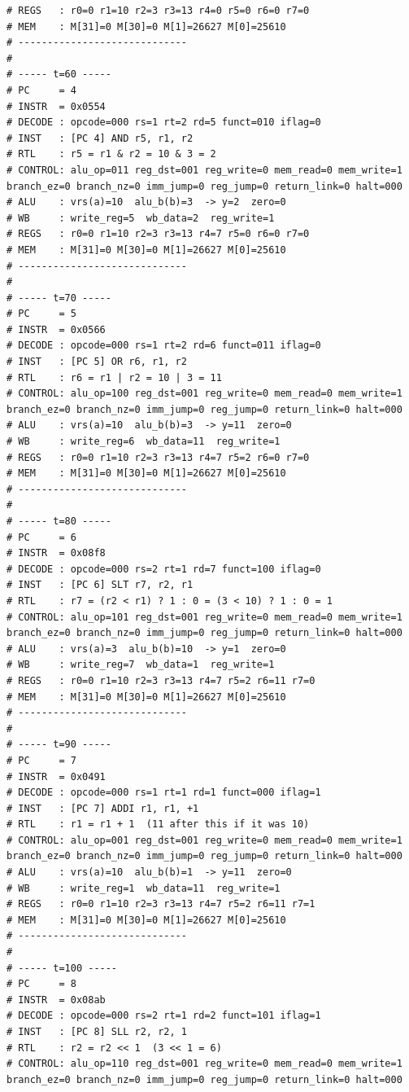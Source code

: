 \documentclass[12pt]{report}
\begin{document}
\begin{lstlisting}
# REGS   : r0=0 r1=10 r2=3 r3=13 r4=0 r5=0 r6=0 r7=0
# MEM    : M[31]=0 M[30]=0 M[1]=26627 M[0]=25610
# -----------------------------
# 
# ----- t=60 -----
# PC     = 4
# INSTR  = 0x0554
# DECODE : opcode=000 rs=1 rt=2 rd=5 funct=010 iflag=0
# INST   : [PC 4] AND r5, r1, r2
# RTL    : r5 = r1 & r2 = 10 & 3 = 2
# CONTROL: alu_op=011 reg_dst=001 reg_write=0 mem_read=0 mem_write=1 branch_ez=0 branch_nz=0 imm_jump=0 reg_jump=0 return_link=0 halt=000
# ALU    : vrs(a)=10  alu_b(b)=3  -> y=2  zero=0
# WB     : write_reg=5  wb_data=2  reg_write=1
# REGS   : r0=0 r1=10 r2=3 r3=13 r4=7 r5=0 r6=0 r7=0
# MEM    : M[31]=0 M[30]=0 M[1]=26627 M[0]=25610
# -----------------------------
# 
# ----- t=70 -----
# PC     = 5
# INSTR  = 0x0566
# DECODE : opcode=000 rs=1 rt=2 rd=6 funct=011 iflag=0
# INST   : [PC 5] OR r6, r1, r2
# RTL    : r6 = r1 | r2 = 10 | 3 = 11
# CONTROL: alu_op=100 reg_dst=001 reg_write=0 mem_read=0 mem_write=1 branch_ez=0 branch_nz=0 imm_jump=0 reg_jump=0 return_link=0 halt=000
# ALU    : vrs(a)=10  alu_b(b)=3  -> y=11  zero=0
# WB     : write_reg=6  wb_data=11  reg_write=1
# REGS   : r0=0 r1=10 r2=3 r3=13 r4=7 r5=2 r6=0 r7=0
# MEM    : M[31]=0 M[30]=0 M[1]=26627 M[0]=25610
# -----------------------------
# 
# ----- t=80 -----
# PC     = 6
# INSTR  = 0x08f8
# DECODE : opcode=000 rs=2 rt=1 rd=7 funct=100 iflag=0
# INST   : [PC 6] SLT r7, r2, r1
# RTL    : r7 = (r2 < r1) ? 1 : 0 = (3 < 10) ? 1 : 0 = 1
# CONTROL: alu_op=101 reg_dst=001 reg_write=0 mem_read=0 mem_write=1 branch_ez=0 branch_nz=0 imm_jump=0 reg_jump=0 return_link=0 halt=000
# ALU    : vrs(a)=3  alu_b(b)=10  -> y=1  zero=0
# WB     : write_reg=7  wb_data=1  reg_write=1
# REGS   : r0=0 r1=10 r2=3 r3=13 r4=7 r5=2 r6=11 r7=0
# MEM    : M[31]=0 M[30]=0 M[1]=26627 M[0]=25610
# -----------------------------
# 
# ----- t=90 -----
# PC     = 7
# INSTR  = 0x0491
# DECODE : opcode=000 rs=1 rt=1 rd=1 funct=000 iflag=1
# INST   : [PC 7] ADDI r1, r1, +1
# RTL    : r1 = r1 + 1  (11 after this if it was 10)
# CONTROL: alu_op=001 reg_dst=001 reg_write=0 mem_read=0 mem_write=1 branch_ez=0 branch_nz=0 imm_jump=0 reg_jump=0 return_link=0 halt=000
# ALU    : vrs(a)=10  alu_b(b)=1  -> y=11  zero=0
# WB     : write_reg=1  wb_data=11  reg_write=1
# REGS   : r0=0 r1=10 r2=3 r3=13 r4=7 r5=2 r6=11 r7=1
# MEM    : M[31]=0 M[30]=0 M[1]=26627 M[0]=25610
# -----------------------------
# 
# ----- t=100 -----
# PC     = 8
# INSTR  = 0x08ab
# DECODE : opcode=000 rs=2 rt=1 rd=2 funct=101 iflag=1
# INST   : [PC 8] SLL r2, r2, 1
# RTL    : r2 = r2 << 1  (3 << 1 = 6)
# CONTROL: alu_op=110 reg_dst=001 reg_write=0 mem_read=0 mem_write=1 branch_ez=0 branch_nz=0 imm_jump=0 reg_jump=0 return_link=0 halt=000

\end{lstlisting}
\end{document}
